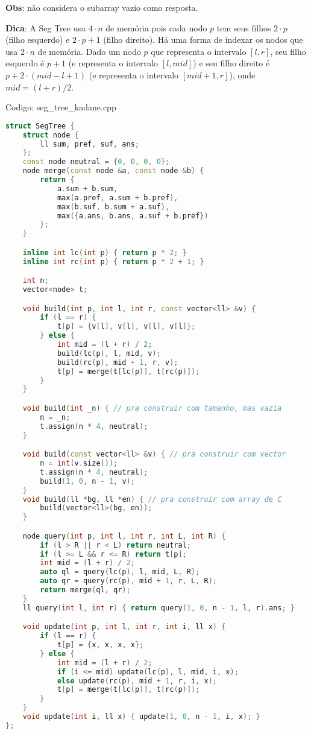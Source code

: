 \documentclass[10pt, a4paper, oneside]{book}
\begin{document}
\textbf{Obs}: não considera o subarray vazio como resposta.



\textbf{Dica}: A Seg Tree usa $4 \cdot n$ de memória pois cada nodo $p$ tem seus filhos $2 \cdot p$ (filho esquerdo) e $2 \cdot p + 1$ (filho direito). Há uma forma de indexar os nodos que usa $2 \cdot n$ de memória. Dado um nodo $p$ que representa o intervalo $[l, r]$, seu filho esquerdo é $p+1$ (e representa o intervalo $[l, mid]$) e seu filho direito é $p+2 \cdot (mid-l+1)$ (e representa o intervalo $[mid+1, r]$), onde $mid = (l+r)/2$.
\hfill

Codigo: seg\_tree\_kadane.cpp

\begin{lstlisting}[language=C++]
struct SegTree {
    struct node {
        ll sum, pref, suf, ans;
    };
    const node neutral = {0, 0, 0, 0};
    node merge(const node &a, const node &b) {
        return {
            a.sum + b.sum,
            max(a.pref, a.sum + b.pref),
            max(b.suf, b.sum + a.suf),
            max({a.ans, b.ans, a.suf + b.pref})
        };
    }

    inline int lc(int p) { return p * 2; }
    inline int rc(int p) { return p * 2 + 1; }

    int n;
    vector<node> t;

    void build(int p, int l, int r, const vector<ll> &v) {
        if (l == r) {
            t[p] = {v[l], v[l], v[l], v[l]};
        } else {
            int mid = (l + r) / 2;
            build(lc(p), l, mid, v);
            build(rc(p), mid + 1, r, v);
            t[p] = merge(t[lc(p)], t[rc(p)]);
        }
    }

    void build(int _n) { // pra construir com tamanho, mas vazia
        n = _n;
        t.assign(n * 4, neutral);
    }

    void build(const vector<ll> &v) { // pra construir com vector
        n = int(v.size());
        t.assign(n * 4, neutral);
        build(1, 0, n - 1, v);
    }
    void build(ll *bg, ll *en) { // pra construir com array de C
        build(vector<ll>(bg, en));
    }

    node query(int p, int l, int r, int L, int R) {
        if (l > R || r < L) return neutral;
        if (l >= L && r <= R) return t[p];
        int mid = (l + r) / 2;
        auto ql = query(lc(p), l, mid, L, R);
        auto qr = query(rc(p), mid + 1, r, L, R);
        return merge(ql, qr);
    }
    ll query(int l, int r) { return query(1, 0, n - 1, l, r).ans; }

    void update(int p, int l, int r, int i, ll x) {
        if (l == r) {
            t[p] = {x, x, x, x};
        } else {
            int mid = (l + r) / 2;
            if (i <= mid) update(lc(p), l, mid, i, x);
            else update(rc(p), mid + 1, r, i, x);
            t[p] = merge(t[lc(p)], t[rc(p)]);
        }
    }
    void update(int i, ll x) { update(1, 0, n - 1, i, x); }
};\end{lstlisting}
\hfill
\end{document}
